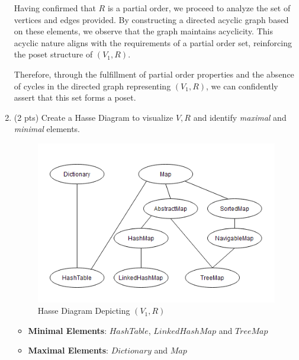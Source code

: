 \documentclass[12pt]{article}
\begin{document}
\begin{spacing}{1.5}
\begin{enumerate}
\begin{itemize}
		      \end{itemize} 
		      		      
		      Having confirmed that $R$ is a partial order, we proceed to analyze the set of vertices and edges provided. By constructing a directed acyclic graph based on these elements, we observe that the graph maintains acyclicity. This acyclic nature aligns with the requirements of a partial order set, reinforcing the poset structure of $(V_1, R)$. 
		      		                  
		      Therefore, through the fulfillment of partial order properties and the absence of cycles in the directed graph representing $(V_1, R)$, we can confidently assert that this set forms a poset.       
		      		      		              
		\item (2 pts) Create a Hasse Diagram to visualize $V, R$ and identify \textit{maximal} and \textit{minimal} elements.
		      		      
		      \begin{figure}[htp]
		      	\centering
		      	\includegraphics{HasseDiagram_6_3_1.png}
		      	\caption{Hasse Diagram Depicting $(V_1,R)$}
		      	\label{fig:figure}
		      \end{figure}
		      		           
		      \begin{itemize}
		      	\item \textbf{Minimal Elements}: $HashTable$, $LinkedHashMap$ and $TreeMap$
		      	\item \textbf{Maximal Elements}: $Dictionary$ and $Map$
		      \end{itemize}
		      		      		      

\end{enumerate}
\end{spacing}
\end{document}
